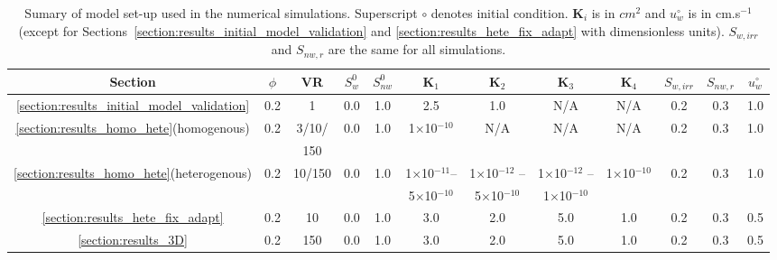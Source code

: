 \begin{landscape}
\begin{table}
  \begin{tabular}{c | c c  c  c  c  c  c  c  c  c   c}
    \hline
      {\bf Section} & $\phi$ & VR  & $S^{0}_{w}$ & $S^{0}_{nw}$ & $\mathbf{K}_{1}$ & $\mathbf{K}_{2}$ & $\mathbf{K}_{3}$ & $\mathbf{K}_{4}$ & $S_{w,irr}$ & $S_{nw,r}$ & $u^{\circ}_{w}$ \\ 
    \hline
     \ref{section:results_initial_model_validation} & 0.2 & 1 & 0.0 & 1.0 & 2.5 & 1.0 & N/A & N/A & 0.2 & 0.3 & 1.0 \\
     \ref{section:results_homo_hete}(homogenous)  & 0.2 & 3/10/ & 0.0 & 1.0 & 1$\times$10$^{-10}$ & N/A & N/A & N/A & 0.2 & 0.3 & 1.0  \\
                                                  &     & 150 &     &     &                    &     &     &     &     &     &      \\
     \ref{section:results_homo_hete}(heterogenous) & 0.2 & 10/150 & 0.0 & 1.0 & 1$\times$10$^{-11} $-- & 1$\times$10$^{-12}$ -- & 1$\times$10$^{-12}$ -- & 1$\times$10$^{-10}$ & 0.2  & 0.3 & 1.0 \\
      &   &  &  &  & 5$\times$10$^{-10}$ & 5$\times$10$^{-10}$ & 1$\times$10$^{-10}$  &  &  &  & \\
     \ref{section:results_hete_fix_adapt}  & 0.2 & 10 & 0.0 & 1.0  & 3.0 & 2.0 & 5.0 & 1.0 & 0.2 & 0.3 & 0.5  \\
     \ref{section:results_3D}  & 0.2 & 150 & 0.0 & 1.0 & 3.0 & 2.0 & 5.0 & 1.0 & 0.2  & 0.3 & 0.5  \\
     \hline
   \end{tabular}
   \caption{Sumary of model set-up used in the numerical simulations. Superscript $\circ$ denotes initial condition. $\mathbf{K}_{i}$ is in $cm^{2}$ and $u^{\circ}_{w}$ is in cm.s$^{-1}$ (except for Sections~\ref{section:results_initial_model_validation} and \ref{section:results_hete_fix_adapt} with dimensionless units). $S_{w,irr}$ and $S_{nw,r}$ are the same for all simulations. }
\label{table:setup}
\end{table}
\end{landscape}
\clearpage


